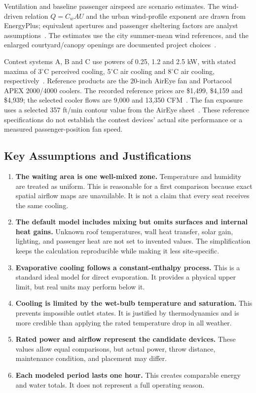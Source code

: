 Ventilation and baseline passenger airspeed are scenario estimates. The wind-driven relation $Q=C_w A U$ and the urban wind-profile exponent are drawn from EnergyPlus; equivalent apertures and passenger sheltering factors are analyst assumptions~\cite{energyplus_wind_ventilation,energyplus_242_surface}. The estimates use the city summer-mean wind references, and the enlarged courtyard/canopy openings are documented project choices~\cite{nasa_2026_dallas_summer,nasa_2026_boston_summer,nasa_2026_phoenix_summer,airflow_scenario_2026,case_study_airflow}.

Contest systems A, B and C use powers of 0.25, 1.2 and 2.5 kW, with stated maxima of 3$^\circ$C perceived cooling, 5$^\circ$C air cooling and 8$^\circ$C air cooling, respectively~\cite{comap_2026_problem_b}. Reference products are the 20-inch AirEye fan and Portacool APEX 2000/4000 coolers. The recorded reference prices are \$1,499, \$4,159 and \$4,939; the selected cooler flows are 9,000 and 13,350 CFM~\cite{aireye_20_price,portacool_2000,portacool_4000}. The fan exposure uses a selected 357 ft/min contour value from the AirEye sheet~\cite{aireye_2021_specs}. These reference specifications do not establish the contest devices' actual site performance or a measured passenger-position fan speed.

\subsection{Key Assumptions and Justifications}
 
\begin{enumerate}
  \item \textbf{The waiting area is one well-mixed zone.} Temperature and humidity are treated as uniform. This is reasonable for a first comparison because exact spatial airflow maps are unavailable. It is not a claim that every seat receives the same cooling.
  \item \textbf{The default model includes mixing but omits surfaces and internal heat gains.} Unknown roof temperatures, wall heat transfer, solar gain, lighting, and passenger heat are not set to invented values. The simplification keeps the calculation reproducible while making it less site-specific.
  \item \textbf{Evaporative cooling follows a constant-enthalpy process.} This is a standard ideal model for direct evaporation. It provides a physical upper limit, but real units may perform below it.
  \item \textbf{Cooling is limited by the wet-bulb temperature and saturation.} This prevents impossible outlet states. It is justified by thermodynamics and is more credible than applying the rated temperature drop in all weather.
  \item \textbf{Rated power and airflow represent the candidate devices.} These values allow equal comparisons, but actual power, throw distance, maintenance condition, and placement may differ.
  \item \textbf{Each modeled period lasts one hour.} This creates comparable energy and water totals. It does not represent a full operating season.
\end{enumerate}
 